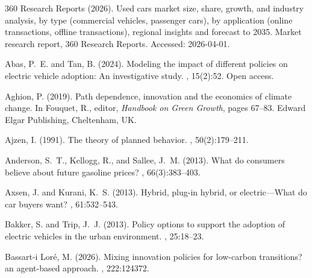\documentclass[12pt]{article}
\begin{document}
	\begin{thebibliography}{}

{360 Research Reports} (2026).
\newblock Used cars market size, share, growth, and industry analysis, by type
  (commercial vehicles, passenger cars), by application (online transactions,
  offline transactions), regional insights and forecast to 2035.
\newblock Market research report, 360 Research Reports.
\newblock Accessed: 2026-04-01.

Abas, P.~E. and Tan, B. (2024).
\newblock Modeling the impact of different policies on electric vehicle
  adoption: An investigative study.
, 15(2):52.
\newblock Open access.

Aghion, P. (2019).
\newblock Path dependence, innovation and the economics of climate change.
\newblock In Fouquet, R., editor, {\em Handbook on Green Growth}, pages 67--83.
  Edward Elgar Publishing, Cheltenham, UK.

Ajzen, I. (1991).
\newblock The theory of planned behavior.
,
  50(2):179--211.

Anderson, S.~T., Kellogg, R., and Sallee, J.~M. (2013).
\newblock What do consumers believe about future gasoline prices?
,
  66(3):383--403.

Axsen, J. and Kurani, K.~S. (2013).
\newblock Hybrid, plug-in hybrid, or electric---{What} do car buyers want?
, 61:532--543.

Bakker, S. and Trip, J.~J. (2013).
\newblock Policy options to support the adoption of electric vehicles in the
  urban environment.
,
  25:18--23.

Bassart-i Loré, M. (2026).
\newblock Mixing innovation policies for low-carbon transitions? an agent-based
  approach.
, 222:124372.


\end{thebibliography}
\end{document}
